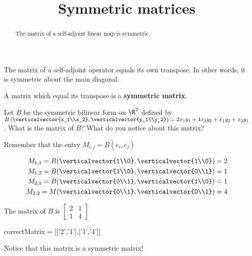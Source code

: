 \documentclass{ximera}
\title{Symmetric matrices}
\begin{document}
\begin{abstract}
  The matrix of a self-adjoint linear map is symmetric.
\end{abstract}

The matrix of a self-adjoint operator equals its own transpose.  In other words, it is symmetric about the main diagonal.  
\begin{definition}
  A matrix which equal its transpose is a \textbf{symmetric matrix}.
\end{definition}

\begin{question}
  Let $B$ be the symmetric bilinear form on $\R^2$ defined by 
  $B\left(\verticalvector{x_1\\x_2},\verticalvector{y_1\\y_2}\right) = 2x_1y_1+4x_2y_2+x_1y_2+x_2y_1$.  
  What is the matrix of $B$?  What do you notice about this matrix?
  \begin{solution}
    \begin{hint}
      Remember that the entry $M_{i,j} = B(e_i,e_j)$
    \end{hint}
    \begin{hint}
      \begin{align*}
        M_{1,1} = B(\verticalvector{1\\0},\verticalvector{1\\0}) = 2\\
        M_{1,2} = B(\verticalvector{1\\0},\verticalvector{0\\1}) = 1\\
        M_{2,1} = B(\verticalvector{0\\1},\verticalvector{1\\0}) = 1\\
        M_{2,2} = M(\verticalvector{0\\1},\verticalvector{0\\1}) = 4
      \end{align*}
    \end{hint}
    \begin{hint}
      The matrix of $B$ is \(\begin{bmatrix} 2 & 1 \\ 1 & 4\end{bmatrix}\)
    \end{hint}
    \begin{matrix-answer}
      correctMatrix = [['2','1'],['1','4']]
    \end{matrix-answer}
  \end{solution}
  Notice that this matrix is a symmetric matrix!
\end{question}
\end{document}
